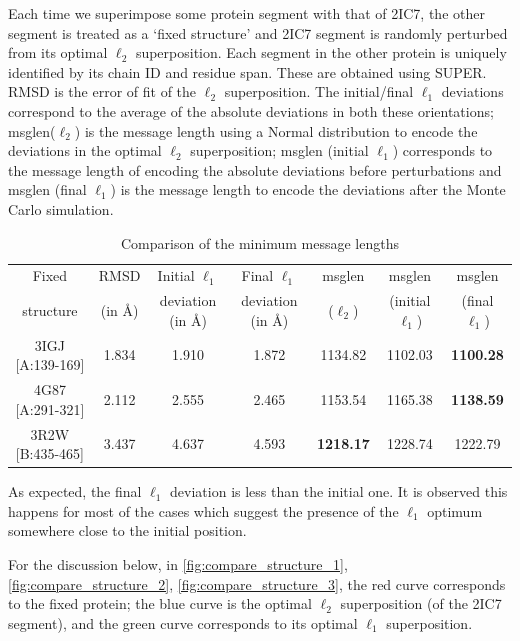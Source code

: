 \documentclass[wcp]{jmlr}
\begin{document}
Each time we superimpose some protein segment with that of 2IC7, the other segment
is treated as a `fixed structure' and 2IC7 segment is randomly perturbed
from its optimal $\ell_2$ superposition. Each segment in the other protein 
is uniquely identified by its chain ID and residue span. These are obtained using SUPER.
RMSD is the error of fit of the $\ell_2$ superposition. The initial/final
$\ell_1$ deviations correspond to the average of the absolute deviations
in both these orientations;
msglen($\ell_2$) is the message length using a Normal distribution to encode the
deviations in the optimal $\ell_2$ superposition; msglen (initial $\ell_1$) corresponds to the
message length of encoding the absolute deviations before perturbations and msglen (final $\ell_1$)
is the message length to encode the deviations after the Monte Carlo simulation.
\begin{table}[ht]
\centering
\caption{Comparison of the minimum message lengths}
\label{tab:comparison_mml}
\begin{tabular}{|c|c|c|c|c|c|c|}
\hline
Fixed & RMSD & Initial $\ell_1$ & Final $\ell_1$ & msglen & msglen & msglen \\
structure & (in \AA) & deviation (in \AA) & deviation (in \AA) & ($\ell_2$) & (initial $\ell_1$) & (final $\ell_1$) \\
\hline
3IGJ [A:139-169] & 1.834 & 1.910 & 1.872 & 1134.82 & 1102.03 & \textbf{1100.28} \\
4G87 [A:291-321] & 2.112 & 2.555 & 2.465 & 1153.54 & 1165.38 & \textbf{1138.59} \\
3R2W [B:435-465] & 3.437 & 4.637 & 4.593 & \textbf{1218.17} & 1228.74 & 1222.79 \\
\hline
\end{tabular}
\end{table}
As expected, the final $\ell_1$ deviation is less than the initial one. It is observed this happens for 
most of the cases which suggest the presence of the $\ell_1$ optimum somewhere close
to the initial position. 

For the discussion below, in \autoref{fig:compare_structure_1}, \ref{fig:compare_structure_2},
\ref{fig:compare_structure_3}, the red curve corresponds to the fixed protein; the blue curve
is the optimal $\ell_2$ superposition (of the 2IC7 segment), and the green curve corresponds to its 
optimal $\ell_1$ superposition.
\end{document}
